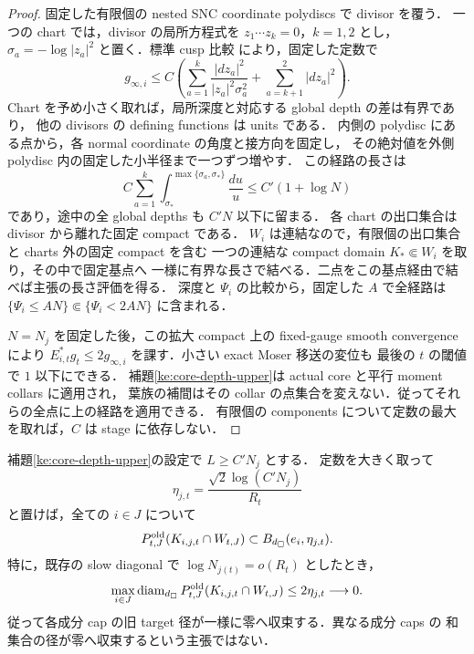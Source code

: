 \begin{proof}
固定した有限個の nested SNC coordinate polydiscs で divisor を覆う．
一つの chart では，divisor の局所方程式を $z_1\cdots z_k=0$，$k=1,2$ とし，
$\sigma_a=-\log|z_a|^2$ と置く．標準 cusp 比較
\cite[\S5, (5.3)--(5.6), Theorem~5.1]{RochonZhang}により，固定した定数で
\[
 g_{\infty,i}\le C\left(
   \sum_{a=1}^k\frac{|dz_a|^2}{|z_a|^2\sigma_a^2}
   +\sum_{a=k+1}^2|dz_a|^2\right).
\]
Chart を予め小さく取れば，局所深度と対応する global depth の差は有界であり，
他の divisors の defining functions は units である．
内側の polydisc にある点から，各 normal coordinate の角度と接方向を固定し，
その絶対値を外側 polydisc 内の固定した小半径まで一つずつ増やす．
この経路の長さは
\[
 C\sum_{a=1}^k\int_{\sigma_*}^{\max\{\sigma_a,\sigma_*\}}\frac{du}{u}
 \le C'(1+\log N)
\]
であり，途中の全 global depths も $C'N$ 以下に留まる．
各 chart の出口集合は divisor から離れた固定 compact である．
$W_i$ は連結なので，有限個の出口集合と charts 外の固定 compact を含む
一つの連結な compact domain $K_*\Subset W_i$ を取り，その中で固定基点へ
一様に有界な長さで結べる．二点をこの基点経由で結べば主張の長さ評価を得る．
深度と $\Psi_i$ の比較から，固定した $A$ で全経路は
$\{\Psi_i\le AN\}\Subset\{\Psi_i<2AN\}$ に含まれる．

$N=N_j$ を固定した後，この拡大 compact 上の fixed-gauge smooth convergence により
$E_{i,t}^*g_t\le2g_{\infty,i}$ を課す．小さい exact Moser 移送の変位も
最後の $t$ の閾値で $1$ 以下にできる．
補題\ref{ke:core-depth-upper}は actual core と平行 moment collars に適用され，
葉族の補間はその collar の点集合を変えない．従ってそれらの全点に上の経路を適用できる．
有限個の components について定数の最大を取れば，$C$ は stage に依存しない．
\end{proof}

\begin{lemma}
\label{ke:removed-corner-target-cap}
補題\ref{ke:core-depth-upper}の設定で $L\ge C' N_j$ とする．
定数を大きく取って
\[
 \eta_{j,t}=\frac{\sqrt2\log(C' N_j)}{R_t}
\]
と置けば，全ての $i\in J$ について
\[
 P^{\rm old}_{t,J}(K_{i,j,t}\cap W_{t,J})
 \subset B_{d_\square}(e_i,\eta_{j,t}).
\]
特に，既存の slow diagonal で $\log N_{j(t)}=o(R_t)$ としたとき，
\[
 \max_{i\in J}\operatorname{diam}_{d_\square}
 P^{\rm old}_{t,J}(K_{i,j,t}\cap W_{t,J})
 \le2\eta_{j,t}\longrightarrow0 .
\]
従って各成分 cap の旧 target 径が一様に零へ収束する．異なる成分 caps の
和集合の径が零へ収束するという主張ではない．
\end{lemma}

